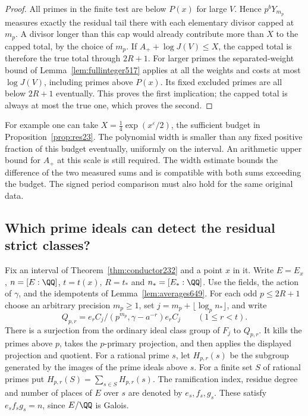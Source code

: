 \documentclass[a4paper,11pt]{article}
\theoremstyle{definition}
\theoremstyle{remark}
\numberwithin{equation}{section}
\begin{document}
\begin{proof}
All primes in the finite test are below \(P(x)\) for large
\(V\). Hence \(p^bY_{m_p}\) measures exactly the residual
tail there with each elementary divisor capped at \(m_p\).
A divisor longer than this cap would already contribute more
than \(X\) to the capped total, by the choice of \(m_p\).
If \(A_++\log J(V)\le X\), the capped total is therefore
the true total through \(2R+1\). For larger primes the
separated-weight bound of Lemma~\ref{lem:fullinteger517}
applies at all the weights and costs at most \(\log J(V)\),
including primes above \(P(x)\). Its fixed excluded primes
are all below \(2R+1\) eventually. This proves the first
implication; the capped total is always at most the true
one, which proves the second.
\end{proof}

For example one can take \(X=\tfrac14\exp(x^\varepsilon/2)\),
the sufficient budget in Proposition~\ref{prop:res23}.
The polynomial width is smaller than any fixed positive
fraction of this budget eventually, uniformly on the
interval. An arithmetic upper bound for \(A_+\) at this
scale is still required. The width estimate bounds the
difference of the two measured sums and is compatible
with both sums exceeding the budget. The signed period
comparison must also hold for the same original data.


\subsection{Which prime ideals can detect the residual strict classes?}
\label{sec:primeideals650}

Fix an interval of Theorem~\ref{thm:conductor232} and a point
\(x\) in it. Write \(E=E_x\), \(n=[E:\QQ]\), \(t=t(x)\),
\(R=t_*\) and \(n_*=[E_*:\QQ]\). Use the fields, the action
of \(\gamma\), and the idempotents of
Lemma~\ref{lem:averages649}. For each odd \(p\le2R+1\)
choose an arbitrary precision \(m_p\ge1\), set
\(j=m_p+\lfloor\log_p n_*\rfloor\), and write
\[
 Q_{p,r}=e_r C_j/(p^{m_p},\gamma-a^{-r})e_r C_j
                   \qquad(1\le r<t).
\]
There is a surjection from the ordinary ideal class group of
\(F_j\) to \(Q_{p,r}\). It kills the primes above \(p\), takes
the \(p\)-primary projection, and then applies the displayed
projection and quotient. For a rational prime \(s\), let
\(H_{p,r}(s)\) be the subgroup generated by the images of the
prime ideals above \(s\). For a finite set \(S\) of rational
primes put \(H_{p,r}(S)=\sum_{s\in S}H_{p,r}(s)\).
The ramification index, residue degree and number of places
of \(E\) over \(s\) are denoted by \(e_s,f_s,g_s\). These
satisfy \(e_s f_s g_s=n\), since \(E/\QQ\) is Galois.
\end{document}

